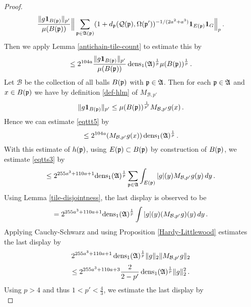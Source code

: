 {\begin{proof}
\begin{equation}
    \frac{\|g\mathbf{1}_{B({\mathfrak p})}\|_{p'}}{\mu(B({\mathfrak p}))}
    \Big\|\sum_{{\mathfrak p}\in\mathfrak{A}({\mathfrak p})}(1+d_{{\mathfrak p}}({\mathcal{Q}}({\mathfrak p}), {\Omega}({\mathfrak p}'))^{-1/(2a^2+a^3)}\mathbf{1}_{E({\mathfrak p})}\mathbf{1}_G\Big\|_{p}\, .
\end{equation}
Then we apply Lemma \ref{antichain-tile-count} to estimate this by
\begin{equation}\label{eqttt5}
    \le  2^{104a}
    \frac{\|g\mathbf{1}_{B({\mathfrak p})}\|_{p'}}{\mu(B({\mathfrak p}))}
    \operatorname{\operatorname{dens}}_1(\mathfrak{A})^{\frac 1p}\mu(B({\mathfrak p}))^{\frac 1p}\,.
\end{equation}
Let $\mathcal{B}$ be the collection of all balls
$B({\mathfrak p})$ with ${\mathfrak p}\in \mathfrak{A}$. Then
for each ${\mathfrak p}\in \mathfrak{A}$ and $x\in B({\mathfrak p})$ we have by
definition  \eqref{def-hlm} of $M_{\mathcal{B},p'}$
\begin{equation}
    \|g\mathbf{1}_{B({\mathfrak p})}\|_{p'}\le
    \mu(B({\mathfrak p}))^{\frac 1{p'}} M_{\mathcal{B},p'}g(x) \, .
\end{equation}
Hence we can estimate \eqref{eqttt5} by
\begin{equation}
\label{eqttt5b}
    \le
    2^{104a}
    (M_{\mathcal{B}, p'}g(x))
   \operatorname{\operatorname{dens}}_1(\mathfrak{A})^{\frac 1p}\, .
\end{equation}
With this estimate of $h({\mathfrak p})$,
using $E({\mathfrak p})\subset B({\mathfrak p})$ by construction of $B({\mathfrak p})$, we estimate
\eqref{eqtts3} by
 \begin{equation}\label{eqtts4}
 \le  2^{255a^3+110a + 1} { \operatorname{\operatorname{dens}}_1(\mathfrak{A})^{\frac 1p}}\sum_{{\mathfrak p}\in \mathfrak{A}}
 \int_{E({\mathfrak p})}|g|(y)M_{\mathcal{B}, p'}g(y) \, dy\,.
         \end{equation}
Using Lemma \ref{tile-disjointness},
the last display is observed to be
\begin{equation}\label{eqtts4a}
=  2^{255a^3+110a + 1}
 {\operatorname{\operatorname{dens}}_1(\mathfrak{A})^{\frac 1p}} \int |g|(y)(M_{\mathcal{B}, p'}g)(y) \, dy\,.
         \end{equation}
Applying Cauchy-Schwarz and using Proposition \ref{Hardy-Littlewood} estimates the last display by
\begin{equation}
    2^{255a^3+110a + 1} \operatorname{\operatorname{dens}}_1(\mathfrak{A})^{\frac 1p}
    \|g\|_2 \|M_{\mathcal{B}, p'} g\|_2
\end{equation}
\begin{equation}
    \le  2^{255a^3+110a + 3}\frac{2}{2-p'}
    \operatorname{\operatorname{dens}}_1(\mathfrak{A})^{\frac 1p}\|g\|_2 ^2\,.
\end{equation}
Using $p>4$ and thus $1<p'<\frac 43$, we estimate the last display by
\begin{equation}

\end{equation}
\end{proof}}
